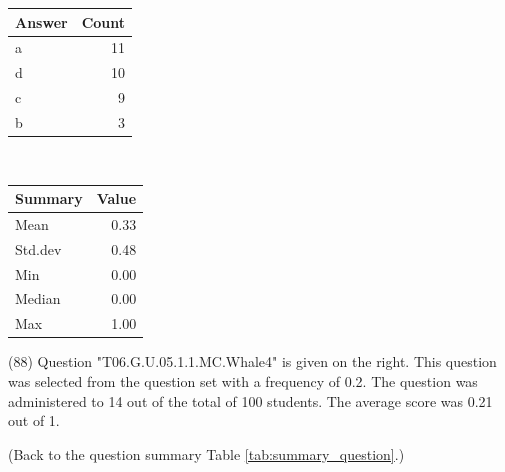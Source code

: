 \documentclass[12pt,nohyper]{tufte-handout}\usepackage[]{graphicx}\usepackage[]{color}
\begin{document}
\begin{center}%
\begin{tabular}{lr}
  \hline
Answer & Count \\ 
  \hline
a &  11 \\ 
  d &  10 \\ 
  c &   9 \\ 
  b &   3 \\ 
   \hline
\end{tabular}
~~~~~~~~%
\begin{tabular}{lr}
  \hline
Summary & Value \\ 
  \hline
Mean & 0.33 \\ 
  Std.dev & 0.48 \\ 
  Min & 0.00 \\ 
  Median & 0.00 \\ 
  Max & 1.00 \\ 
   \hline
\end{tabular}
\end{center}\newpage{} (88) Question "T06.G.U.05.1.1.MC.Whale4" is given on the right. This question was selected from the question set with a frequency of 0.2. The question was administered to 14 out of the total of 100 students. The average score was 0.21 out of 1.

 (Back to the question summary Table \ref{tab:summary_question}.)
\end{document}

